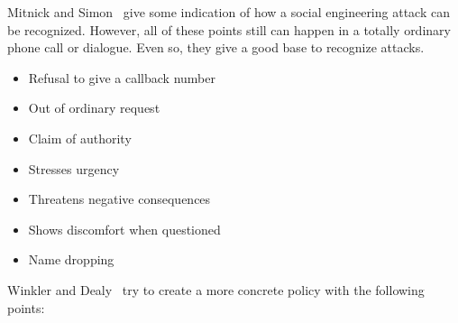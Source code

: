 Mitnick and Simon~\cite{mitnick2003} give some indication of how a social
engineering attack can be recognized. However, all of these points still can
happen in a totally ordinary phone call or dialogue. Even so, they give a good
base to recognize attacks.

\begin{itemize}
  \item Refusal to give a callback number
  \item Out of ordinary request
  \item Claim of authority
  \item Stresses urgency
  \enlargethispage{\baselineskip}
  \item Threatens negative consequences
  \item Shows discomfort when questioned
  \item Name dropping
\end{itemize}

Winkler and Dealy~\cite{winkler1995} try to create a more concrete policy with
the following points:

